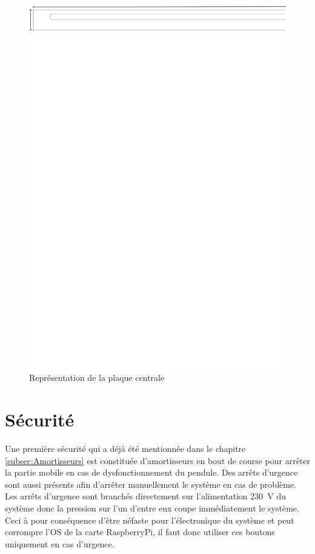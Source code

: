 \begin{figure}[H]
    \centering
    \includegraphics[width = \textwidth]{assets/figures/PlaquePassageMoteur.svg}
    \caption{Représentation de la plaque centrale}
    \label{fig:PLaPassMot}
\end{figure}

\section{Sécurité}\label{sec:Securite}
Une première sécurité qui a déjà été mentionnée dans le chapitre \ref{subsec:Amortisseurs} est constituée d'amortisseurs en bout de course pour
arrêter la partie mobile en cas de dysfonctionnement du pendule. Des arrêts d'urgence sont aussi présents afin d'arrêter manuellement le système
en cas de problème. Les arrêts d'urgence sont branchés directement sur l'alimentation 230~V du système donc la pression sur l'un d'entre eux coupe
immédiatement le système. Ceci à pour conséquence d'être néfaste pour l'électronique du système et peut corrompre l'OS de la carte RaspberryPi, il
faut donc utiliser ces boutons uniquement en cas d'urgence.\\

